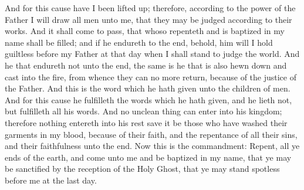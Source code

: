 \bverse \iffalse And for this cause have I been lifted up; therefore, according to the power of the Father I will draw all men unto me, that they may be judged according to their works. \fi
And for this cause have I been lifted up; therefore, according to the power of the Father I will draw all men unto me, that they may be judged according to their works.
\bverse \iffalse And it shall come to pass, that whoso repenteth and is baptized in my name shall be filled; and if he endureth to the end, behold, him will I hold guiltless before my Father at that day when I shall stand to judge the world. \fi
And it shall come to pass, that whoso repenteth and is baptized in my name shall be filled; and if he endureth to the end, behold, him will I hold guiltless before my Father at that day when I shall stand to judge the world.
\bverse \iffalse And he that endureth not unto the end, the same is he that is also hewn down and cast into the fire, from whence they can no more return, because of the justice of the Father. \fi
And he that endureth not unto the end, the same is he that is also hewn down and cast into the fire, from whence they can no more return, because of the justice of the Father.
\bverse \iffalse And this is the word which he hath given unto the children of men. And for this cause he fulfilleth the words which he hath given, and he lieth not, but fulfilleth all his words. \fi
And this is the word which he hath given unto the children of men. And for this cause he fulfilleth the words which he hath given, and he lieth not, but fulfilleth all his words.
\bverse \iffalse And no unclean thing can enter into his kingdom; therefore nothing entereth into his rest save it be those who have washed their garments in my blood, because of their faith, and the repentance of all their sins, and their faithfulness unto the end. \fi
And no unclean thing can enter into his kingdom; therefore nothing entereth into his rest save it be those who have washed their garments in my blood, because of their faith, and the repentance of all their sins, and their faithfulness unto the end.
\bverse \iffalse Now this is the commandment: Repent, all ye ends of the earth, and come unto me and be baptized in my name, that ye may be sanctified by the reception of the Holy Ghost, that ye may stand spotless before me at the last day. \fi
Now this is the commandment: Repent, all ye ends of the earth, and come unto me and be baptized in my name, that ye may be sanctified by the reception of the Holy Ghost, that ye may stand spotless before me at the last day.
